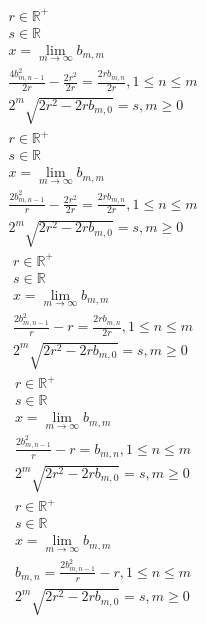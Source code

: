 \documentclass[a4paper,12pt]{report}
\begin{document}
\begin{subequations}
\begin{gather}
r \in \mathbb{R}^+ \\
s \in \mathbb{R} \\
x = \lim \limits_{m \to \infty} b_{m,m} \\
\frac{4b_{m,n-1}^2}{2r} - \frac{2r^2}{2r} = \frac{2rb_{m,n}}{2r}, 1 \leq n \leq m \\
2^m \sqrt{2r^2 - 2rb_{m,0}} = s, m \geq 0
\end{gather}
\end{subequations}
\begin{subequations}
\begin{gather}
r \in \mathbb{R}^+ \\
s \in \mathbb{R} \\
x = \lim \limits_{m \to \infty} b_{m,m} \\
\frac{2b_{m,n-1}^2}{r} - \frac{2r^2}{2r} = \frac{2rb_{m,n}}{2r}, 1 \leq n \leq m \\
2^m \sqrt{2r^2 - 2rb_{m,0}} = s, m \geq 0
\end{gather}
\end{subequations}
\begin{subequations}
\begin{gather}
r \in \mathbb{R}^+ \\
s \in \mathbb{R} \\
x = \lim \limits_{m \to \infty} b_{m,m} \\
\frac{2b_{m,n-1}^2}{r} - r = \frac{2rb_{m,n}}{2r}, 1 \leq n \leq m \\
2^m \sqrt{2r^2 - 2rb_{m,0}} = s, m \geq 0
\end{gather}
\end{subequations}
\begin{subequations}
\begin{gather}
r \in \mathbb{R}^+ \\
s \in \mathbb{R} \\
x = \lim \limits_{m \to \infty} b_{m,m} \\
\frac{2b_{m,n-1}^2}{r} - r = b_{m,n}, 1 \leq n \leq m \\
2^m \sqrt{2r^2 - 2rb_{m,0}} = s, m \geq 0
\end{gather}
\end{subequations}
\begin{subequations}
\begin{gather}
r \in \mathbb{R}^+ \\
s \in \mathbb{R} \\
x = \lim \limits_{m \to \infty} b_{m,m} \\
b_{m,n} = \frac{2b_{m,n-1}^2}{r} - r, 1 \leq n \leq m \\
2^m \sqrt{2r^2 - 2rb_{m,0}} = s, m \geq 0
\end{gather}
\end{subequations}
\end{document}
